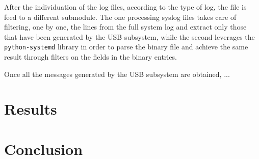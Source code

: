 \documentclass[a4paper]{article}
\begin{document}
After the individuation of the log files, according to the type of log, the file
is feed to a different submodule. The one processing syslog files takes care of
filtering, one by one, the lines from the full system log and extract only those
that have been generated by the USB subsystem, while the second leverages the
\texttt{python-systemd} library in order to parse the binary file and achieve
the same result through filters on the fields in the binary entries.

Once all the messages generated by the USB subsystem are obtained, ...

\section{Results}
\label{sec:goals}


\section{Conclusion}
\label{sec:concl}



\end{document}
